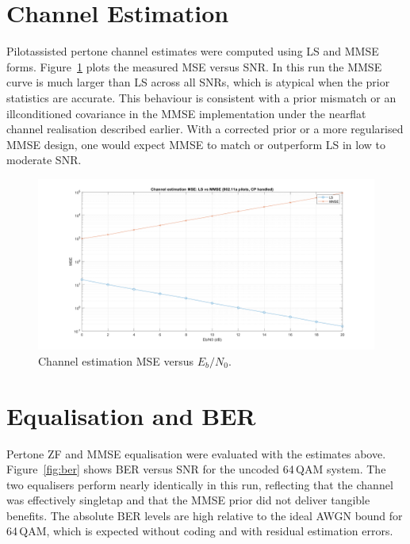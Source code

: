 \documentclass[journal,onecolumn]{IEEEtran}
\begin{document}
\section{Channel Estimation}
Pilot\textendash assisted per\textendash tone channel estimates were computed using LS and MMSE forms. Figure~\ref{fig:mse} plots the measured MSE versus SNR. In this run the MMSE curve is much larger than LS across all SNRs, which is atypical when the prior statistics are accurate. This behaviour is consistent with a prior mismatch or an ill\textendash conditioned covariance in the MMSE implementation under the near\textendash flat channel realisation described earlier. With a corrected prior or a more regularised MMSE design, one would expect MMSE to match or outperform LS in low to moderate SNR.

\begin{figure}[!t]
\centering
\includegraphics[width=\linewidth]{3.png}
\caption{Channel estimation MSE versus $E_b/N_0$.}
\label{fig:mse}
\end{figure}

\section{Equalisation and BER}
Per\textendash tone ZF and MMSE equalisation were evaluated with the estimates above. Figure~\ref{fig:ber} shows BER versus SNR for the uncoded 64\,QAM system. The two equalisers perform nearly identically in this run, reflecting that the channel was effectively single\textendash tap and that the MMSE prior did not deliver tangible benefits. The absolute BER levels are high relative to the ideal AWGN bound for 64\,QAM, which is expected without coding and with residual estimation errors.
\end{document}
